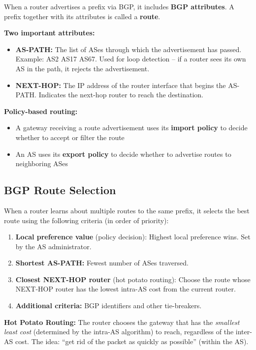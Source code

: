 \begin{keybox}
When a router advertises a prefix via BGP, it includes \textbf{BGP attributes}. A prefix together with its attributes is called a \textbf{route}.

\textbf{Two important attributes:}
\begin{itemize}[noitemsep]
    \item \textbf{AS-PATH:} The list of ASes through which the advertisement has passed. Example: AS2 AS17 AS67. Used for loop detection -- if a router sees its own AS in the path, it rejects the advertisement.
    \item \textbf{NEXT-HOP:} The IP address of the router interface that begins the AS-PATH. Indicates the next-hop router to reach the destination.
\end{itemize}

\textbf{Policy-based routing:}
\begin{itemize}[noitemsep]
    \item A gateway receiving a route advertisement uses its \textbf{import policy} to decide whether to accept or filter the route
    \item An AS uses its \textbf{export policy} to decide whether to advertise routes to neighboring ASes
\end{itemize}
\end{keybox}

\begin{imagebox}
\end{imagebox}

\subsection{BGP Route Selection}

\begin{exambox}
When a router learns about multiple routes to the same prefix, it selects the best route using the following criteria (in order of priority):

\begin{enumerate}[noitemsep]
    \item \textbf{Local preference value} (policy decision): Highest local preference wins. Set by the AS administrator.
    \item \textbf{Shortest AS-PATH:} Fewest number of ASes traversed.
    \item \textbf{Closest NEXT-HOP router} (hot potato routing): Choose the route whose NEXT-HOP router has the lowest intra-AS cost from the current router.
    \item \textbf{Additional criteria:} BGP identifiers and other tie-breakers.
\end{enumerate}

\medskip
\textbf{Hot Potato Routing:} The router chooses the gateway that has the \emph{smallest least cost} (determined by the intra-AS algorithm) to reach, regardless of the inter-AS cost. The idea: ``get rid of the packet as quickly as possible'' (within the AS).
\end{exambox}

